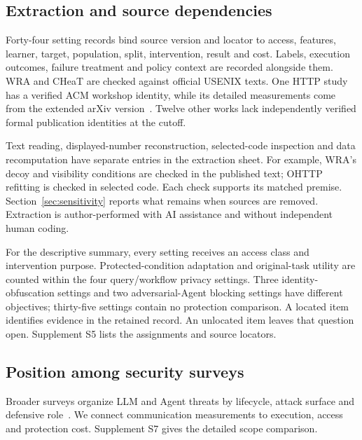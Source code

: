 \subsection{Extraction and source dependencies}
Forty-four setting records bind source version and locator to access, features, learner, target, population, split, intervention, result and cost. Labels, execution outcomes, failure treatment and policy context are recorded alongside them. WRA and CHeaT are checked against official USENIX texts. One HTTP study has a verified ACM workshop identity, while its detailed measurements come from the extended arXiv version~\cite{borysenko2026http,borysenko2026short}. Twelve other works lack independently verified formal publication identities at the cutoff.

Text reading, displayed-number reconstruction, selected-code inspection and data recomputation have separate entries in the extraction sheet. For example, WRA's decoy and visibility conditions are checked in the published text; OHTTP refitting is checked in selected code. Each check supports its matched premise. Section~\ref{sec:sensitivity} reports what remains when sources are removed. Extraction is author-performed with AI assistance and without independent human coding.

For the descriptive summary, every setting receives an access class and intervention purpose. Protected-condition adaptation and original-task utility are counted within the four query/workflow privacy settings. Three identity-obfuscation settings and two adversarial-Agent blocking settings have different objectives; thirty-five settings contain no protection comparison. A located item identifies evidence in the retained record. An unlocated item leaves that question open. Supplement S5 lists the assignments and source locators.

\subsection{Position among security surveys}
Broader surveys organize LLM and Agent threats by lifecycle, attack surface and defensive role~\cite{yao2024survey,shahriar2025survey,ferrag2025survey}. We connect communication measurements to execution, access and protection cost. Supplement S7 gives the detailed scope comparison.
